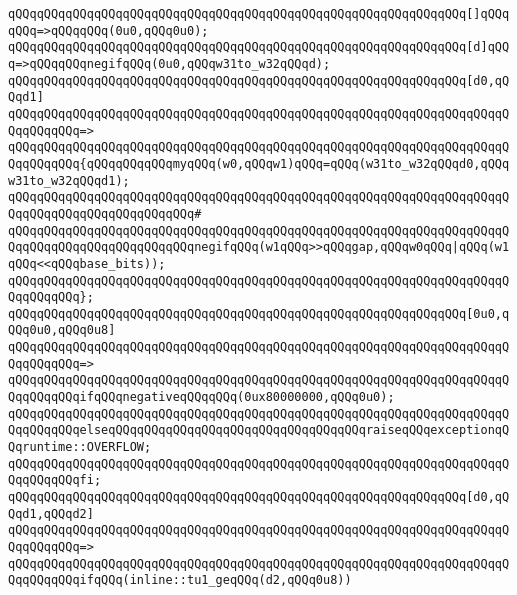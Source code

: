 \verb|qQQqqQQqqQQqqQQqqQQqqQQqqQQqqQQqqQQqqQQqqQQqqQQqqQQqqQQqqQQqqQQq[]qQQqqQQq=>qQQqqQQq(0u0,qQQq0u0);|\newline
\verb|qQQqqQQqqQQqqQQqqQQqqQQqqQQqqQQqqQQqqQQqqQQqqQQqqQQqqQQqqQQqqQQq[d]qQQq=>qQQqqQQqnegifqQQq(0u0,qQQqw31to_w32qQQqd);|\newline
\newline
\verb|qQQqqQQqqQQqqQQqqQQqqQQqqQQqqQQqqQQqqQQqqQQqqQQqqQQqqQQqqQQqqQQq[d0,qQQqd1]|\newline
\verb|qQQqqQQqqQQqqQQqqQQqqQQqqQQqqQQqqQQqqQQqqQQqqQQqqQQqqQQqqQQqqQQqqQQqqQQqqQQqqQQq=>|\newline
\verb|qQQqqQQqqQQqqQQqqQQqqQQqqQQqqQQqqQQqqQQqqQQqqQQqqQQqqQQqqQQqqQQqqQQqqQQqqQQqqQQq{qQQqqQQqqQQqmyqQQq(w0,qQQqw1)qQQq=qQQq(w31to_w32qQQqd0,qQQqw31to_w32qQQqd1);|\newline
\verb|qQQqqQQqqQQqqQQqqQQqqQQqqQQqqQQqqQQqqQQqqQQqqQQqqQQqqQQqqQQqqQQqqQQqqQQqqQQqqQQqqQQqqQQqqQQqqQQq#|\newline
\verb|qQQqqQQqqQQqqQQqqQQqqQQqqQQqqQQqqQQqqQQqqQQqqQQqqQQqqQQqqQQqqQQqqQQqqQQqqQQqqQQqqQQqqQQqqQQqqQQqnegifqQQq(w1qQQq>>qQQqgap,qQQqw0qQQq|\verb#|qQQq(w1qQQq<<qQQqbase_bits));#\newline
\verb|qQQqqQQqqQQqqQQqqQQqqQQqqQQqqQQqqQQqqQQqqQQqqQQqqQQqqQQqqQQqqQQqqQQqqQQqqQQqqQQq};|\newline
\newline
\verb|qQQqqQQqqQQqqQQqqQQqqQQqqQQqqQQqqQQqqQQqqQQqqQQqqQQqqQQqqQQqqQQq[0u0,qQQq0u0,qQQq0u8]|\newline
\verb|qQQqqQQqqQQqqQQqqQQqqQQqqQQqqQQqqQQqqQQqqQQqqQQqqQQqqQQqqQQqqQQqqQQqqQQqqQQqqQQq=>|\newline
\verb|qQQqqQQqqQQqqQQqqQQqqQQqqQQqqQQqqQQqqQQqqQQqqQQqqQQqqQQqqQQqqQQqqQQqqQQqqQQqqQQqifqQQqnegativeqQQqqQQq(0ux80000000,qQQq0u0);|\newline
\verb|qQQqqQQqqQQqqQQqqQQqqQQqqQQqqQQqqQQqqQQqqQQqqQQqqQQqqQQqqQQqqQQqqQQqqQQqqQQqqQQqelseqQQqqQQqqQQqqQQqqQQqqQQqqQQqqQQqqQQqraiseqQQqexceptionqQQqruntime::OVERFLOW;|\newline
\verb|qQQqqQQqqQQqqQQqqQQqqQQqqQQqqQQqqQQqqQQqqQQqqQQqqQQqqQQqqQQqqQQqqQQqqQQqqQQqqQQqfi;|\newline
\newline
\verb|qQQqqQQqqQQqqQQqqQQqqQQqqQQqqQQqqQQqqQQqqQQqqQQqqQQqqQQqqQQqqQQq[d0,qQQqd1,qQQqd2]|\newline
\verb|qQQqqQQqqQQqqQQqqQQqqQQqqQQqqQQqqQQqqQQqqQQqqQQqqQQqqQQqqQQqqQQqqQQqqQQqqQQqqQQq=>|\newline
\verb|qQQqqQQqqQQqqQQqqQQqqQQqqQQqqQQqqQQqqQQqqQQqqQQqqQQqqQQqqQQqqQQqqQQqqQQqqQQqqQQqifqQQq(inline::tu1_geqQQq(d2,qQQq0u8))|\newline
